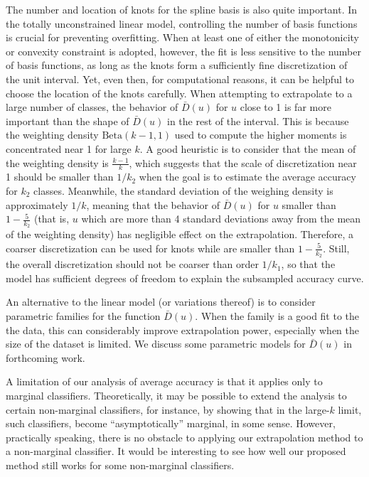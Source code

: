 \documentclass[twoside,11pt]{article}
\begin{document}
The number and location of knots for the spline basis is also quite important.  In the totally unconstrained linear model, controlling the number of basis functions is crucial for preventing overfitting.  When at least one of either the monotonicity or convexity constraint is adopted, however, the fit is less sensitive to the number of basis functions, as long as the knots form a sufficiently fine discretization of the unit interval.  Yet, even then, for computational reasons, it can be helpful to choose the location of the knots carefully.  When attempting to extrapolate to a large number of classes, the behavior of $\bar{D}(u)$ for $u$ close to 1 is far more important than the shape of $\bar{D}(u)$ in the rest of the interval.  This is because the weighting density $\text{Beta}(k-1, 1)$ used to compute the higher moments is concentrated near 1 for large $k$.  A good heuristic is to consider that the mean of the weighting density is $\frac{k-1}{k}$, which suggests that the scale of discretization near 1 should be smaller than $1/k_2$ when the goal is to estimate the average accuracy for $k_2$ classes.  Meanwhile, the standard deviation of the weighing density is approximately $1/k$, meaning that the behavior of $\bar{D}(u)$ for $u$ smaller than $1 - \frac{5}{k_2}$ (that is, $u$ which are more than 4 standard deviations away from the mean of the weighting density) has negligible effect on the extrapolation.  Therefore, a coarser discretization can be used for knots while are smaller than $1 - \frac{5}{k_2}$.  Still, the overall discretization should not be coarser than order $1/k_1$, so that the model has sufficient degrees of freedom to explain the subsampled accuracy curve.

An alternative to the linear model (or variations thereof) is to consider parametric families for the function $\bar{D}(u)$.  When the family is a good fit to the the data, this can considerably improve extrapolation power, especially when the size of the dataset is limited.  We discuss some parametric models for $\bar{D}(u)$ in forthcoming work.

A limitation of our analysis of average accuracy is that it applies only to marginal classifiers.  Theoretically, it may be possible to extend the analysis to certain non-marginal classifiers, for instance, by showing that in the large-$k$ limit, such classifiers, become ``asymptotically'' marginal, in some sense.  However, practically speaking, there is no obstacle to applying our extrapolation method to a non-marginal classifier.  It would be interesting to see how well our proposed method still works for some non-marginal classifiers.
\end{document}
